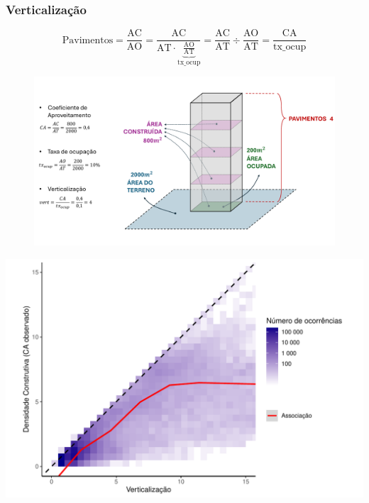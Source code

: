 \documentclass[%
    8pt, 
    aspectratio=169,
]{beamer}
\begin{document}
\begin{frame}
    \label{appendix:verticalizacao}
    \frametitle{Verticalização}
    \begin{equation*}
        \text{Pavimentos}=\frac{\text{AC}}{\text{AO}}=\frac{\text{AC}}{\text{AT}\cdot\underbrace{\frac{\text{AO}}{\text{AT}}}_\text{tx\_ocup}}=\frac{\text{AC}}{\text{AT}}\div\frac{\text{AO}}{\text{AT}}=\frac{\text{CA}}{\text{tx\_ocup}}
    \end{equation*}
    \begin{figure}
        \centering
        \includegraphics[height = .6\textheight]{imagens/desenho.pdf}
    \end{figure}
\end{frame}


\begin{frame}
    \centering
    \includegraphics[width = \textheight]{imagens/ca_vs_verticalizacao.pdf}
\end{frame}
\end{document}
